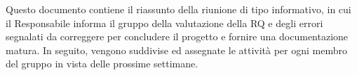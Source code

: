 Questo documento contiene il riassunto della riunione di tipo informativo, in cui il Responsabile informa il gruppo della valutazione della RQ e degli errori segnalati da correggere per concludere il progetto e fornire una documentazione matura. In seguito, vengono suddivise ed assegnate le attività per ogni membro del gruppo in vista delle prossime settimane.
